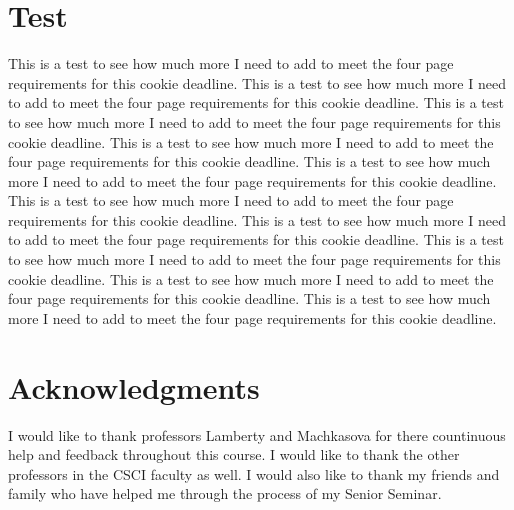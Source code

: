 \documentclass{sig-alternate}
\begin{document}

\section{Test}
\label{sec:test}
This is a test to see how much more I need to add to meet the four page requirements for this cookie deadline. This is a test to see how much more I need to add to meet the four page requirements for this cookie deadline. This is a test to see how much more I need to add to meet the four page requirements for this cookie deadline. This is a test to see how much more I need to add to meet the four page requirements for this cookie deadline. This is a test to see how much more I need to add to meet the four page requirements for this cookie deadline. This is a test to see how much more I need to add to meet the four page requirements for this cookie deadline. This is a test to see how much more I need to add to meet the four page requirements for this cookie deadline. This is a test to see how much more I need to add to meet the four page requirements for this cookie deadline. This is a test to see how much more I need to add to meet the four page requirements for this cookie deadline. This is a test to see how much more I need to add to meet the four page requirements for this cookie deadline. 

\section*{Acknowledgments}
\label{sec:acknowledgments}

I would like to thank professors Lamberty and Machkasova for there countinuous help and feedback throughout this course. I would  like to thank the other professors in the CSCI faculty as well. I would also like to thank my friends and family who have helped me through the process of my Senior Seminar.


  
\end{document}
